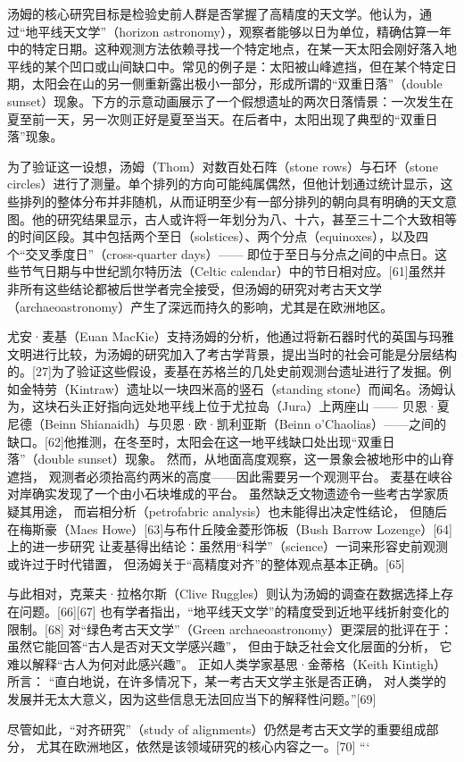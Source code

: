 汤姆的核心研究目标是检验史前人群是否掌握了高精度的天文学。他认为，通过“地平线天文学”（horizon astronomy），观察者能够以日为单位，精确估算一年中的特定日期。这种观测方法依赖寻找一个特定地点，在某一天太阳会刚好落入地平线的某个凹口或山间缺口中。常见的例子是：太阳被山峰遮挡，但在某个特定日期，太阳会在山的另一侧重新露出极小一部分，形成所谓的“双重日落”（double sunset）现象。下方的示意动画展示了一个假想遗址的两次日落情景：一次发生在夏至前一天，另一次则正好是夏至当天。在后者中，太阳出现了典型的“双重日落”现象。

为了验证这一设想，汤姆（Thom）对数百处石阵（stone rows）与石环（stone circles）进行了测量。单个排列的方向可能纯属偶然，但他计划通过统计显示，这些排列的整体分布并非随机，从而证明至少有一部分排列的朝向具有明确的天文意图。他的研究结果显示，古人或许将一年划分为八、十六，甚至三十二个大致相等的时间区段。其中包括两个至日（solstices）、两个分点（equinoxes），以及四个“交叉季度日”（cross-quarter days）—— 即位于至日与分点之间的中点日。这些节气日期与中世纪凯尔特历法（Celtic calendar）中的节日相对应。[61]虽然并非所有这些结论都被后世学者完全接受，但汤姆的研究对考古天文学（archaeoastronomy）产生了深远而持久的影响，尤其是在欧洲地区。

尤安·麦基（Euan MacKie）支持汤姆的分析，他通过将新石器时代的英国与玛雅文明进行比较，为汤姆的研究加入了考古学背景，提出当时的社会可能是分层结构的。[27]为了验证这些假设，麦基在苏格兰的几处史前观测台遗址进行了发掘。例如金特劳（Kintraw）遗址以一块四米高的竖石（standing stone）而闻名。汤姆认为，这块石头正好指向远处地平线上位于尤拉岛（Jura）上两座山 —— 贝恩·夏尼德（Beinn Shianaidh）与贝恩·欧·凯利亚斯（Beinn o’Chaolias）——之间的缺口。[62]他推测，在冬至时，太阳会在这一地平线缺口处出现“双重日落”（double sunset）现象。 然而，从地面高度观察，这一景象会被地形中的山脊遮挡，  
观测者必须抬高约两米的高度——因此需要另一个观测平台。  
麦基在峡谷对岸确实发现了一个由小石块堆成的平台。  
虽然缺乏文物遗迹令一些考古学家质疑其用途，  
而岩相分析（petrofabric analysis）也未能得出决定性结论，  
但随后在梅斯豪（Maes Howe）[63]与布什丘陵金菱形饰板（Bush Barrow Lozenge）[64]上的进一步研究  
让麦基得出结论：虽然用“科学”（science）一词来形容史前观测或许过于时代错置，  
但汤姆关于“高精度对齐”的整体观点基本正确。[65]

\bigskip
与此相对，克莱夫·拉格尔斯（Clive Ruggles）则认为汤姆的调查在数据选择上存在问题。[66][67]  
也有学者指出，“地平线天文学”的精度受到近地平线折射变化的限制。[68]  
对“绿色考古天文学”（Green archaeoastronomy）更深层的批评在于：  
虽然它能回答“古人是否对天文学感兴趣”，  
但由于缺乏社会文化层面的分析，  
它难以解释“古人为何对此感兴趣”。  
正如人类学家基思·金蒂格（Keith Kintigh）所言：  
“直白地说，在许多情况下，某一考古天文学主张是否正确，  
对人类学的发展并无太大意义，因为这些信息无法回应当下的解释性问题。”[69]  

尽管如此，“对齐研究”（study of alignments）仍然是考古天文学的重要组成部分，  
尤其在欧洲地区，依然是该领域研究的核心内容之一。[70]
```

